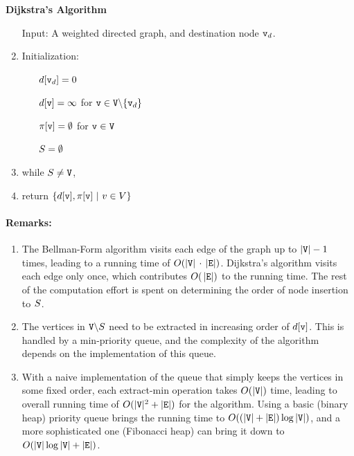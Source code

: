 \begin{algorithm_}\textbf{Dijkstra's Algorithm}
\begin{enumerate}
\item[ Input: ] A weighted directed graph, and destination node ${\tt v}_d$.

\item Initialization:
\begin{itemize}
  \item[] $d[{\tt v}_d] = 0$
  \item[] $d[{\tt v}] = \infty $ for ${\tt v} \in {\tt V}\backslash \{ {\tt v}_d\} $
  \item[] $\pi [{\tt v}] = \emptyset $ for ${\tt v} \in {\tt V}$
  \item[] ${S} = \emptyset $
\end{itemize}

\item while ${S} \ne {\tt V}$,




\item return $\{ d[\nodev],\policy [\nodev] \ |\ v \in V\} $
\end{enumerate}
\end{algorithm_}

\paragraph{Remarks:}
\begin{enumerate}
  \item The Bellman-Form algorithm visits each edge of the graph up to $|{\tt V}|-1$ times, leading to a running time of $O(|{\tt V}|\, \cdot \,|{\tt E}|)$. Dijkstra's algorithm visits each edge only once, which contributes $O(\,|{\tt E}|)$ to the running time. The rest of the computation effort is spent on determining the order of node insertion to ${S}$.
  \item	The vertices in ${\tt V}\backslash {S}$ need to be extracted in increasing order of $d[{\tt v}]$.  This is handled by a min-priority queue, and the complexity of the algorithm depends on the implementation of this queue.
  \item	With a naive implementation of the queue that simply keeps the vertices in some fixed order, each extract-min operation takes  $O(|{\tt V}|)$ time, leading to overall running time of $O(|{\tt V}{|^2} + |{\tt E}|)$ for the algorithm. Using a basic (binary heap) priority queue brings the running time to $O((|{\tt V}| + |{\tt E}|)\log |{\tt V}|)$, and a more sophisticated one (Fibonacci heap) can bring it down to  $O(|{\tt V}|\log |{\tt V}| + |{\tt E}|)$.
\end{enumerate}

